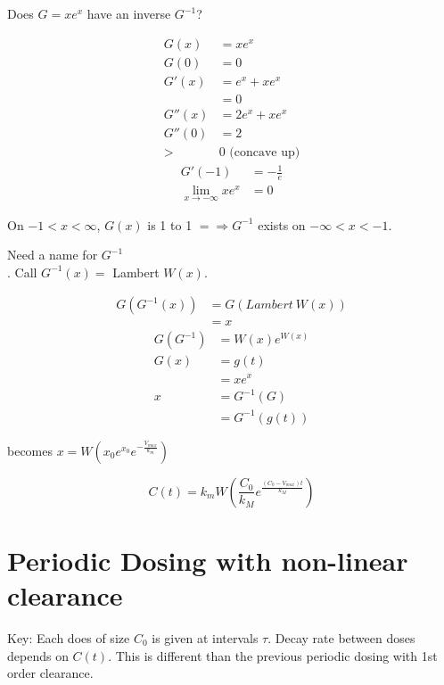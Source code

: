 \documentclass[
	date={October 30{,} 2024},
	month={10},
	day={30}
]{math486notes}
\begin{document}
Does $G = xe^{x}$ have an inverse $G^{-1}$?

\begin{equation*}
\begin{aligned}
	G(x) &= xe^{x}\\
	G(0) &= 0\\
	G'(x) &= e^{x} + xe^{x}\\
	&= 0\\
	G''(x) &= 2e^{x} + xe^{x}\\
	G''(0) &= 2\\
	>& 0 \mbox{  (concave up)}
\end{aligned}
\end{equation*}
\begin{equation*}
\begin{aligned}
	G'(-1) &= -\frac{1}{e}\\
	\lim_{x\rightarrow -\infty} xe^{x} &= 0
\end{aligned}
\end{equation*}

On $-1 < x < \infty$, $G(x)$ is 1 to 1 $=\Rightarrow G^{-1}$ exists on $-\infty < x < -1$.

Need a name for $G^{-1}$\\.
Call $G^{-1}(x) =$ Lambert $W(x)$.

\begin{equation*}
\begin{aligned}
	G(G^{-1}(x)) &= G(Lambert\ W(x))\\ &= x
\end{aligned}
\end{equation*}
\begin{equation*}
\begin{aligned}
	G(G^{-1}) &= W(x)e^{W(x)}\\
	G(x) &= g(t)\\
	&= xe^{x}\\
	x &= G^{-1}(G)\\
	&= G^{-1}(g(t))
\end{aligned}
\end{equation*}

becomes $x = W\left( x_{0}e^{x_{0}}e^{-\frac{V_{max}}{k_{m}}}  \right)$ %

\begin{equation}
	C(t) = k_{m}W\left( \frac{C_{0}}{k_{M}}e^{\frac{(C_{0} - V_{max})t}{k_{M}}} \right)
	\label{eq:c-lambert}
\end{equation}

\section{Periodic Dosing with non-linear clearance}\label{sec:periodic-dosing-with-non-linear-clearance}
Key: Each does of size $C_{0}$ is given at intervals $\tau$.
Decay rate between doses depends on $C(t)$.
This is different than the previous periodic dosing with 1st order clearance.
\end{document}
